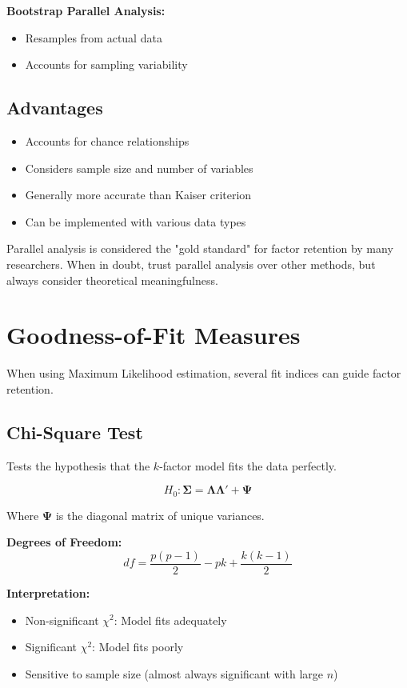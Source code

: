 \documentclass[a4paper]{tufte-book}
\begin{document}
\textbf{Bootstrap Parallel Analysis:}
\begin{itemize}
\item Resamples from actual data
\item Accounts for sampling variability
\end{itemize}

\subsection{Advantages}

\begin{itemize}
\item Accounts for chance relationships
\item Considers sample size and number of variables
\item Generally more accurate than Kaiser criterion
\item Can be implemented with various data types
\end{itemize}

\begin{learningtip}
Parallel analysis is considered the "gold standard" for factor retention by many researchers. When in doubt, trust parallel analysis over other methods, but always consider theoretical meaningfulness.
\end{learningtip}

\section{Goodness-of-Fit Measures}

When using Maximum Likelihood estimation, several fit indices can guide factor retention.

\subsection{Chi-Square Test}

Tests the hypothesis that the $k$-factor model fits the data perfectly.

$$H_0: \boldsymbol{\Sigma} = \boldsymbol{\Lambda}\boldsymbol{\Lambda}' + \boldsymbol{\Psi}$$

Where $\boldsymbol{\Psi}$ is the diagonal matrix of unique variances.

\textbf{Degrees of Freedom:}
$$df = \frac{p(p-1)}{2} - pk + \frac{k(k-1)}{2}$$

\textbf{Interpretation:}
\begin{itemize}
\item Non-significant $\chi^2$: Model fits adequately
\item Significant $\chi^2$: Model fits poorly
\item Sensitive to sample size (almost always significant with large $n$)
\end{itemize}
\end{document}
